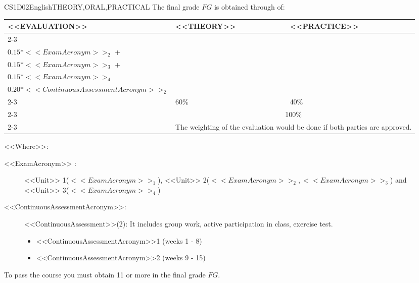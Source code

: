   \begin{evaluation}{CS1D02}{English}{THEORY,ORAL,PRACTICAL}
  The final grade $FG$ is obtained through of:

  \begin{tabularx}{0.9\textwidth}{|X|p{}|p{}|} \hline
  \multirow{4}{*}{\uppercase{<<Evaluation>>}} & \uppercase{<<Theory>>} & \uppercase{<<Practice>>} \\ \cline{2-3}
  & %
      \begin{minipage}{0.95\textwidth}
      \begin{tabular}{l}
          $0.15*<<ExamAcronym>>_{1}$  + \\
          $0.15*<<ExamAcronym>>_{2}$  + \\
          $0.15*<<ExamAcronym>>_{3}$  + \\
          $0.15*<<ExamAcronym>>_{4}$
          \end{tabular} 
      \end{minipage} 
  & %
      \begin{minipage}{0.95\textwidth}
      \begin{tabular}{l}
          $0.20*<<ContinuousAssessmentAcronym>>_{1}$ + \\
          $0.20*<<ContinuousAssessmentAcronym>>_{2}$ 
      \end{tabular} 
      \end{minipage}                 \\ \cline{2-3}

  & %
  60\% 
  & %
  40\% \\ \cline{2-3}
  & \multicolumn{2}{|c|}{100\%}  \\ \cline{2-3}
  & \multicolumn{2}{|c|}{The weighting of the evaluation would be done if both parties are approved.}  \\ \hline
  \end{tabularx}
      
  \vspace{2mm}
  \noindent <<Where>>:
  \begin{description}
      \item[<<ExamAcronym>> :] <<Unit>> 1($<<ExamAcronym>>_{1}$), <<Unit>> 2($<<ExamAcronym>>_{2}, <<ExamAcronym>>_{3}$) and <<Unit>> 3($<<ExamAcronym>>_{4}$) 
      \item[<<ContinuousAssessmentAcronym>>:]<<ContinuousAssessment>>(2): It includes group work, active participation in class, exercise test.
        \begin{itemize}
              \item <<ContinuousAssessmentAcronym>>1 (weeks 1 - 8) 
              \item <<ContinuousAssessmentAcronym>>2 (weeks 9 - 15)
        \end{itemize}
  \end{description}
 
  \noindent To pass the course you must obtain 11 or more in the final grade $FG$.
  \end{evaluation}
 

